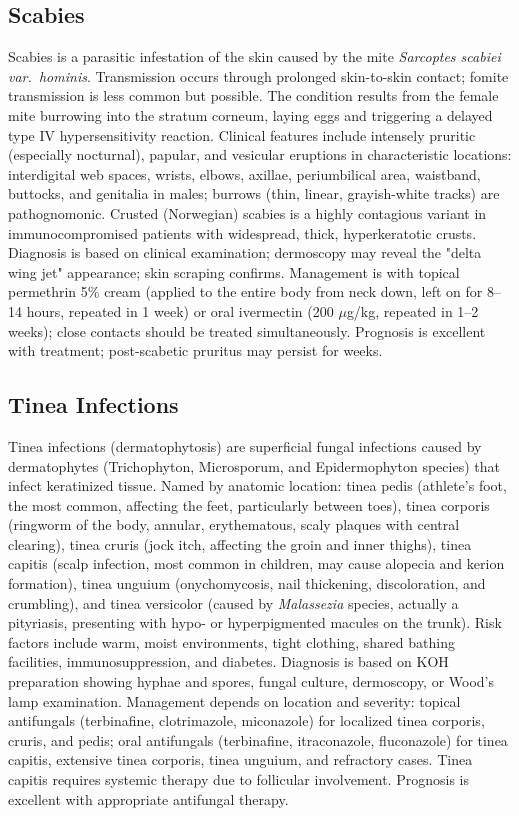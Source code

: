 \subsection{Scabies}
\label{sec:Scabies}
Scabies is a parasitic infestation of the skin caused by the mite \textit{Sarcoptes scabiei var.~hominis}. Transmission occurs through prolonged skin-to-skin contact; fomite transmission is less common but possible. The condition results from the female mite burrowing into the stratum corneum, laying eggs and triggering a delayed type IV hypersensitivity reaction. Clinical features include intensely pruritic (especially nocturnal), papular, and vesicular eruptions in characteristic locations: interdigital web spaces, wrists, elbows, axillae, periumbilical area, waistband, buttocks, and genitalia in males; burrows (thin, linear, grayish-white tracks) are pathognomonic. Crusted (Norwegian) scabies is a highly contagious variant in immunocompromised patients with widespread, thick, hyperkeratotic crusts. Diagnosis is based on clinical examination; dermoscopy may reveal the "delta wing jet" appearance; skin scraping confirms. Management is with topical permethrin 5\% cream (applied to the entire body from neck down, left on for 8--14 hours, repeated in 1 week) or oral ivermectin (200 $\mu$g/kg, repeated in 1--2 weeks); close contacts should be treated simultaneously. Prognosis is excellent with treatment; post-scabetic pruritus may persist for weeks.

\subsection{Tinea Infections}
\label{sec:Tinea Infections}
Tinea infections (dermatophytosis) are superficial fungal infections caused by dermatophytes (Trichophyton, Microsporum, and Epidermophyton species) that infect keratinized tissue. Named by anatomic location: tinea pedis (athlete's foot, the most common, affecting the feet, particularly between toes), tinea corporis (ringworm of the body, annular, erythematous, scaly plaques with central clearing), tinea cruris (jock itch, affecting the groin and inner thighs), tinea capitis (scalp infection, most common in children, may cause alopecia and kerion formation), tinea unguium (onychomycosis, nail thickening, discoloration, and crumbling), and tinea versicolor (caused by \textit{Malassezia} species, actually a pityriasis, presenting with hypo- or hyperpigmented macules on the trunk). Risk factors include warm, moist environments, tight clothing, shared bathing facilities, immunosuppression, and diabetes. Diagnosis is based on KOH preparation showing hyphae and spores, fungal culture, dermoscopy, or Wood's lamp examination. Management depends on location and severity: topical antifungals (terbinafine, clotrimazole, miconazole) for localized tinea corporis, cruris, and pedis; oral antifungals (terbinafine, itraconazole, fluconazole) for tinea capitis, extensive tinea corporis, tinea unguium, and refractory cases. Tinea capitis requires systemic therapy due to follicular involvement. Prognosis is excellent with appropriate antifungal therapy.

